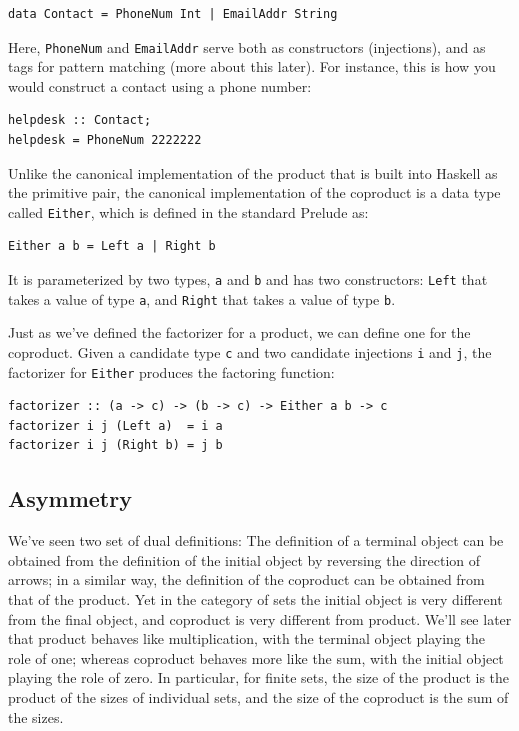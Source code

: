 \begin{verbatim}
data Contact = PhoneNum Int | EmailAddr String
\end{verbatim}

\noindent
Here, \texttt{PhoneNum} and \texttt{EmailAddr} serve both as
constructors (injections), and as tags for pattern matching (more about
this later). For instance, this is how you would construct a contact
using a phone number:

\begin{verbatim}
helpdesk :: Contact;
helpdesk = PhoneNum 2222222
\end{verbatim}

\noindent
Unlike the canonical implementation of the product that is built into
Haskell as the primitive pair, the canonical implementation of the
coproduct is a data type called \texttt{Either}, which is defined in the
standard Prelude as:

\begin{verbatim}
Either a b = Left a | Right b
\end{verbatim}

\noindent
It is parameterized by two types, \texttt{a} and \texttt{b} and has two
constructors: \texttt{Left} that takes a value of type \texttt{a}, and
\texttt{Right} that takes a value of type \texttt{b}.

Just as we've defined the factorizer for a product, we can define one
for the coproduct. Given a candidate type \texttt{c} and two candidate
injections \texttt{i} and \texttt{j}, the factorizer for \texttt{Either}
produces the factoring function:

\begin{verbatim}
factorizer :: (a -> c) -> (b -> c) -> Either a b -> c
factorizer i j (Left a)  = i a
factorizer i j (Right b) = j b
\end{verbatim}

\subsection{Asymmetry}\label{asymmetry}

We've seen two set of dual definitions: The definition of a terminal
object can be obtained from the definition of the initial object by
reversing the direction of arrows; in a similar way, the definition of
the coproduct can be obtained from that of the product. Yet in the
category of sets the initial object is very different from the final
object, and coproduct is very different from product. We'll see later
that product behaves like multiplication, with the terminal object
playing the role of one; whereas coproduct behaves more like the sum,
with the initial object playing the role of zero. In particular, for
finite sets, the size of the product is the product of the sizes of
individual sets, and the size of the coproduct is the sum of the sizes.

